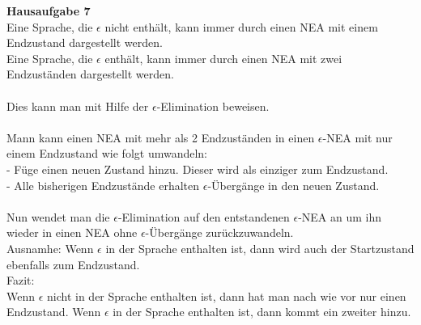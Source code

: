 \documentclass[a4paper,12pt]{article}
\newcommand{\Aufgabe}[1]{
        {
        \vspace*{0.5cm}
        \textbf{Hausaufgabe #1}
        \vspace*{0.2cm}
    }
}
\begin{document}
    \Aufgabe{7} \\
    Eine Sprache, die $ \epsilon $ nicht enthält, kann immer durch einen NEA mit einem Endzustand dargestellt werden. \\
    Eine Sprache, die $ \epsilon $ enthält, kann immer durch einen NEA mit zwei Endzuständen dargestellt werden. \\ \\

    Dies kann man mit Hilfe der $ \epsilon $-Elimination beweisen. \\ \\

    Mann kann einen NEA mit mehr als 2 Endzuständen in einen $ \epsilon $-NEA mit nur einem Endzustand wie folgt umwandeln: \\
    - Füge einen neuen Zustand hinzu.
    Dieser wird als einziger zum Endzustand. \\
    - Alle bisherigen Endzustände erhalten  $ \epsilon $-Übergänge in den neuen Zustand. \\ \\

    Nun wendet man die $ \epsilon $-Elimination auf den entstandenen $ \epsilon $-NEA an um ihn wieder in einen NEA ohne $ \epsilon $-Übergänge zurückzuwandeln. \\
    Ausnamhe: Wenn $ \epsilon $ in der Sprache enthalten ist, dann wird auch der Startzustand ebenfalls zum Endzustand. \\

    Fazit: \\
    Wenn $ \epsilon $ nicht in der Sprache enthalten ist, dann hat man nach wie vor nur einen Endzustand.
    Wenn $ \epsilon $ in der Sprache enthalten ist, dann kommt ein zweiter hinzu.
\end{document}
